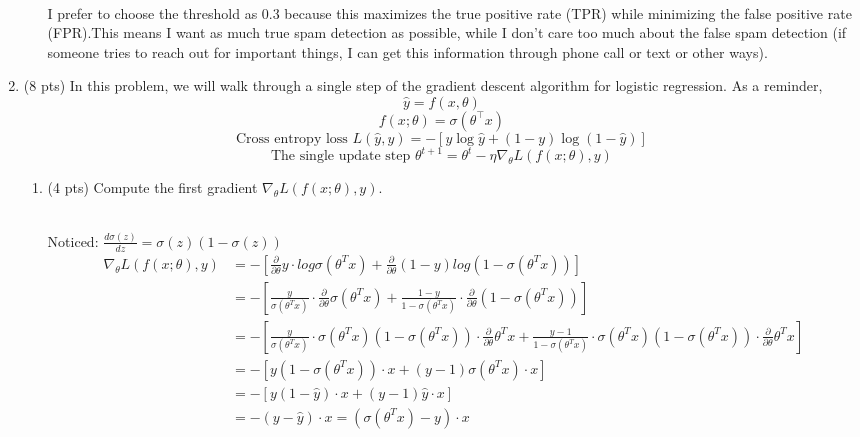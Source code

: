 \documentclass[a4paper]{article}
\theoremstyle{definition}
\newenvironment{soln}{
    \leavevmode\color{blue}\ignorespaces
}{}
\begin{document}
\begin{enumerate}
\begin{enumerate}
	\begin{soln}\\
	I prefer to choose the threshold as 0.3 because this maximizes the true positive rate (TPR) while minimizing the false positive rate (FPR).This means I want as much true spam detection as possible, while I don't care too much about the false spam detection (if someone tries to reach out for important things, I can get this information through phone call or text or other ways).
	\end{soln}
\end{enumerate}

\item (8 pts) In this problem, we will walk through a single step of the gradient descent algorithm for logistic regression. As a reminder,
$$\hat{y} = f(x, \theta)$$
$$f(x;\theta) = \sigma(\theta^\top x)$$
$$\text{Cross entropy loss } L(\hat{y}, y) = -[y \log  \hat{y} + (1-y)\log(1-\hat{y})]$$
$$\text{The single update step } \theta^{t+1} = \theta^{t} - \eta \nabla_{\theta} L(f(x;\theta), y) $$



\begin{enumerate}
	\item (4 pts) Compute the first gradient $\nabla_{\theta} L(f(x;\theta), y)$.
	
	\begin{soln}\\
	Noticed: $\frac{d \sigma(z)}{dz} = \sigma(z)(1-\sigma(z))$\\
	\begin{align*}
	\nabla_{\theta} L(f(x;\theta), y) &= - [ \frac{\partial }{\partial \theta } y \cdot log \sigma(\theta^T x) +  \frac{\partial }{\partial \theta } (1-y) log (1 - \sigma(\theta^T x))]\\
	&= - [ \frac{y}{\sigma(\theta^T x)} \cdot \frac{\partial }{\partial \theta } \sigma(\theta^T x) +  \frac{1-y}{1 - \sigma(\theta^T x)} \cdot \frac{\partial }{\partial \theta } (1 - \sigma(\theta^T x))]\\
	&= - [ \frac{y}{\sigma(\theta^T x)} \cdot \sigma(\theta^T x)(1-\sigma(\theta^T x)) \cdot \frac{\partial }{\partial \theta } \theta^T x +  \frac{y-1}{1 - \sigma(\theta^T x)} \cdot \sigma(\theta^T x)(1-\sigma(\theta^T x)) \cdot \frac{\partial }{\partial \theta } \theta^T x]\\
	&= - [ y(1-\sigma(\theta^T x)) \cdot x +  (y-1) \sigma(\theta^T x) \cdot x]\\
	&= - [ y (1- \hat{y}) \cdot x + (y-1) \hat{y} \cdot x]\\
	&= - (y - \hat{y}) \cdot x = ( \sigma(\theta^T x) - y) \cdot x
	\end{align*}
	\end{soln}
	

\end{enumerate}
\end{enumerate}
\end{document}
